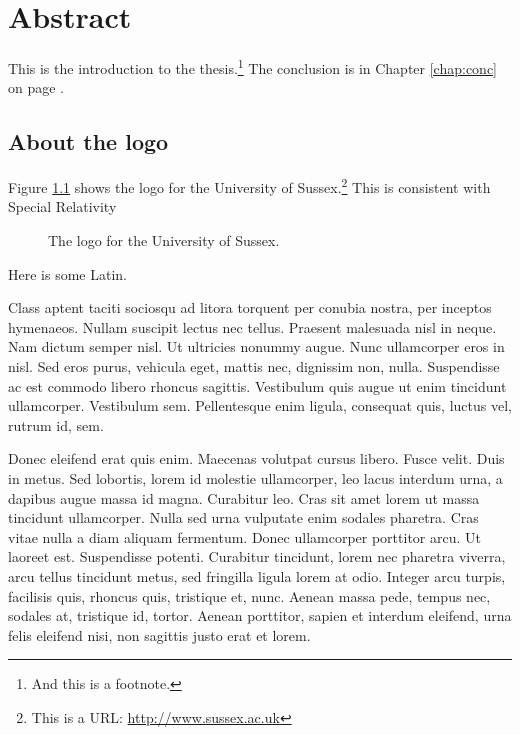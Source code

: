 

% 

\chapter{Abstract}
\label{chap:Abstract}

This is the introduction to the thesis.\footnote{And this is a footnote.}  The conclusion is in Chapter \ref{chap:conc} on page \pageref{chap:conc}.

\section{About the logo}

Figure \ref{us_figure} shows the logo for the University of Sussex.\footnote{This is a URL: \url{http://www.sussex.ac.uk}} This is consistent with Special Relativity 
\citep{Bojinov2000}

\begin{figure}
\centering
\caption[US Logo (optional short caption)]{\label{us_figure} The logo for the University of Sussex.}
\end{figure}

Here is some Latin.

Class aptent taciti sociosqu ad litora torquent per conubia nostra, per inceptos hymenaeos. Nullam suscipit lectus nec tellus. Praesent malesuada nisl in neque. Nam dictum semper nisl. Ut ultricies nonummy augue. Nunc ullamcorper eros in nisl. Sed eros purus, vehicula eget, mattis nec, dignissim non, nulla. Suspendisse ac est commodo libero rhoncus sagittis. Vestibulum quis augue ut enim tincidunt ullamcorper. Vestibulum sem. Pellentesque enim ligula, consequat quis, luctus vel, rutrum id, sem.

Donec eleifend erat quis enim. Maecenas volutpat cursus libero. Fusce velit. Duis in metus. Sed lobortis, lorem id molestie ullamcorper, leo lacus interdum urna, a dapibus augue massa id magna. Curabitur leo. Cras sit amet lorem ut massa tincidunt ullamcorper. Nulla sed urna vulputate enim sodales pharetra. Cras vitae nulla a diam aliquam fermentum. Donec ullamcorper porttitor arcu. Ut laoreet est. Suspendisse potenti. Curabitur tincidunt, lorem nec pharetra viverra, arcu tellus tincidunt metus, sed fringilla ligula lorem at odio. Integer arcu turpis, facilisis quis, rhoncus quis, tristique et, nunc. Aenean massa pede, tempus nec, sodales at, tristique id, tortor. Aenean porttitor, sapien et interdum eleifend, urna felis eleifend nisi, non sagittis justo erat et lorem.

